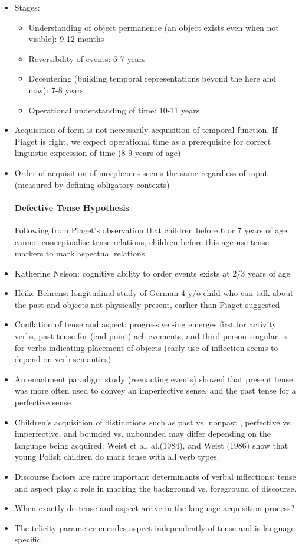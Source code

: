\documentclass{article}
\begin{document}
\begin{itemize}
    \item Stages:
    \begin{itemize}
        \item Understanding of object permanence (an object exists even when not visible): 9-12 months
        \item Reversibility of events: 6-7 years
        \item Decentering (building temporal representations beyond the here and now): 7-8 years
        \item Operational understanding of time: 10-11 years
    \end{itemize}
    \item Acquisition of form is not necessarily acquisition of temporal function. If Piaget is right, we expect operational time as a prerequisite for correct linguistic expression of time (8-9 years of age)
    \item Order of acquisition of morphemes seems the same regardless of input (measured by defining obligatory contexts)
    \paragraph{Defective Tense Hypothesis} Following from Piaget's observation that children before 6 or 7 years of age cannot conceptualise tense relations, children before this age use tense markers to mark aspectual relations
    \item Katherine Nelson: cognitive ability to order events exists at 2/3 years of age
    \item Heike Behrens: longitudinal study of German 4 y/o child who can talk about the past and objects not physically present, earlier than Piaget suggested
    \item Conflation of tense and aspect: progressive -ing emerges first for activity verbs, past tense for (end point) achievements, and third person singular -s for verbs indicating placement of objects (early use of inflection seems to depend on verb semantics)
    \item An enactment paradigm study (reenacting events) showed that present tense was more often used to convey an imperfective sense, and the past tense for a perfective sense
    \item Children's acquisition of distinctions such as past vs. nonpast , perfective vs.
    imperfective, and bounded vs. unbounded may differ depending on the
    language being acquired: Weist et al. al.(1984), and Weist (1986) show that young
    Polish children do mark tense with all verb types.
    \item Discourse factors are more important determinants of verbal inflections: tense
    and aspect play a role in marking the background vs. foreground of discourse.
    \item When exactly do tense and aspect arrive in the language acquisition process?
    \item The telicity parameter encodes aspect independently of tense and is language-specific
\end{itemize}
\end{document}

